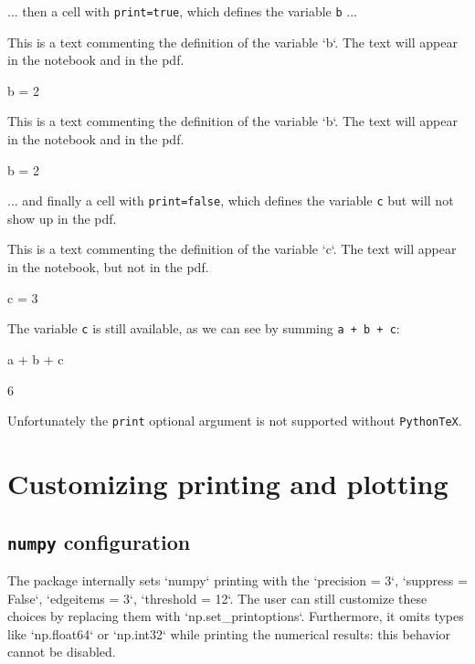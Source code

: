 \documentclass[oneside]{book}
\begin{document}
... then a cell with \texttt{print=true}, which defines the variable \texttt{b} ...

\ifPythonTeXLoaded
\begin{mdcell}[print=true]
This is a text commenting the definition of the variable `b`. The text will appear in the notebook and in the pdf.
\end{mdcell}
\begin{pycell}[print=true]
b = 2
\end{pycell}
\else
\begin{mdcell}
This is a text commenting the definition of the variable `b`. The text will appear in the notebook and in the pdf.
\end{mdcell}
\begin{pycell}
b = 2
\end{pycell}
\fi

... and finally a cell with \texttt{print=false}, which defines the variable \texttt{c} but will not show up in the pdf.

\ifPythonTeXLoaded
\begin{mdcell}[print=false]
This is a text commenting the definition of the variable `c`. The text will appear in the notebook, but not in the pdf.
\end{mdcell}
\begin{pycell}[print=false]
c = 3
\end{pycell}
\else
\fi

The variable \texttt{c} is still available, as we can see by summing \texttt{a + b + c}:
\begin{pycell}
a + b + c
\end{pycell}
\begin{pyexpectedoutput}
6
\end{pyexpectedoutput}

Unfortunately the \texttt{print} optional argument is not supported without \texttt{PythonTeX}.

\chapter{Customizing printing and plotting}

\section{\texttt{numpy} configuration}

\begin{mdcell}
The package internally sets `numpy` printing with the `precision = 3`, `suppress = False`, `edgeitems = 3`, `threshold = 12`. The user can still customize these choices by replacing them with `np.set_printoptions`. Furthermore, it omits types like `np.float64` or `np.int32` while printing the numerical results: this behavior cannot be disabled.
\end{mdcell}
\end{document}
